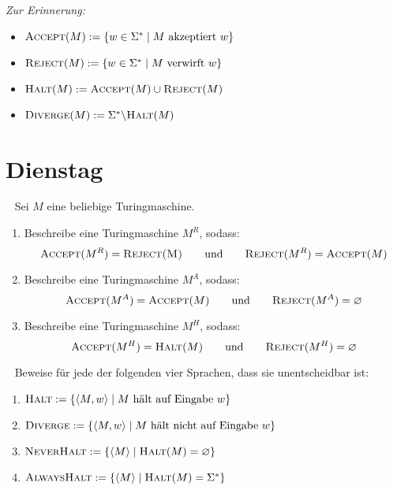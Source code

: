 \documentclass{uebung_cs}
\begin{document}
\emph{Zur Erinnerung:}
\begin{itemize}
	\item $\textsc{Accept}(M) := \{w \in \Sigma^{\ast} \;|\; M \text{ akzeptiert } w\}$
	\item $\textsc{Reject}(M) := \{w \in \Sigma^{\ast} \;|\; M \text{ verwirft } w\}$
	\item $\textsc{Halt}(M) := \textsc{Accept}(M) \cup \textsc{Reject}(M)$
	\item $\textsc{Diverge}(M) := \Sigma^{\ast} \backslash \textsc{Halt}(M)$
\end{itemize}

\section*{Dienstag}
\begin{exercise}[Turingmaschinen][\atschool\easy]\
	Sei $M$ eine beliebige Turingmaschine.
	\begin{enumerate}
		\item Beschreibe eine Turingmaschine $M^R$, sodass:
		$$\textsc{Accept}(M^R) = \textsc{Reject(M)} \qquad \text{und} \qquad \textsc{Reject}(M^R) = \textsc{Accept}(M)$$
		
		\item Beschreibe eine Turingmaschine $M^A$, sodass:
		$$\textsc{Accept}(M^A) = \textsc{Accept}(M) \qquad \text{und} \qquad \textsc{Reject}(M^A) = \varnothing$$
		
		\item Beschreibe eine Turingmaschine $M^H$, sodass:
		$$\textsc{Accept}(M^H) = \textsc{Halt}(M) \qquad \text{und} \qquad \textsc{Reject}(M^H) = \varnothing$$
	\end{enumerate}
\end{exercise}

\begin{exercise}[Entscheidbarkeit I][\atschool\medium]\
	Beweise für jede der folgenden vier Sprachen, dass sie unentscheidbar ist:
	\begin{enumerate}
		\item $\textsc{Halt} := \{\langle M,w\rangle \;|\; M \text{ hält auf Eingabe } w\}$
		\item $\textsc{Diverge} := \{\langle M,w\rangle \;|\; M \text{ hält nicht auf Eingabe } w\}$
		\item $\textsc{NeverHalt} := \{\langle M \rangle \;|\; \textsc{Halt}(M) = \varnothing\}$
		\item $\textsc{AlwaysHalt} := \{\langle M \rangle \;|\; \textsc{Halt}(M) = \Sigma^{\ast}\}$
	\end{enumerate}
\end{exercise}
\end{document}
